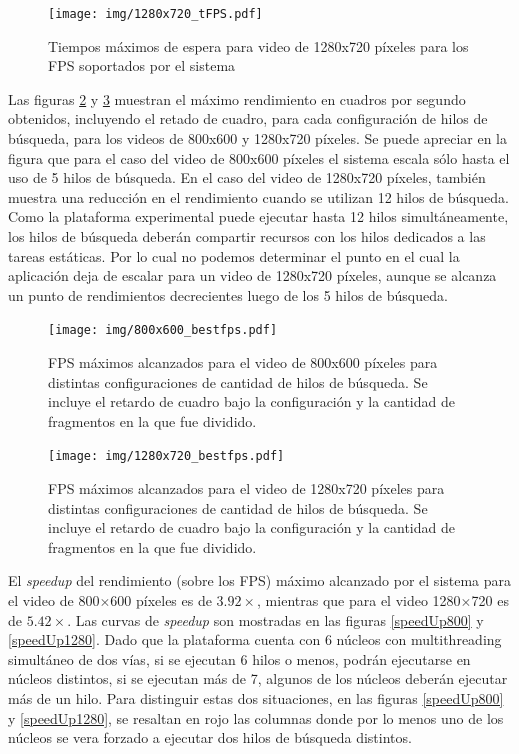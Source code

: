 \begin{figure}[!htb]

	\texttt{[image: img/1280x720\_tFPS.pdf]}
	\caption{Tiempos máximos de espera para video de 1280x720 píxeles para
	los FPS soportados por el sistema}
	\label{1280tFPS}

\end{figure}

Las figuras \ref{bestFPS800} y \ref{bestFPS1280} muestran el máximo rendimiento
en cuadros por segundo obtenidos, incluyendo el retado de cuadro, para cada
configuración de hilos de búsqueda, para los videos de 800x600 y 1280x720
píxeles. Se puede apreciar en la figura que para el caso del video de 800x600
píxeles el sistema escala sólo hasta el uso de 5 hilos de búsqueda. En el caso
del video de 1280x720 píxeles, también muestra una reducción en el rendimiento
cuando se utilizan 12 hilos de búsqueda. Como la plataforma experimental puede
ejecutar hasta 12 hilos simultáneamente, los hilos de búsqueda deberán compartir
recursos con los hilos dedicados a las tareas estáticas. Por lo cual no podemos
determinar el punto en el cual la aplicación deja de escalar para un video de
1280x720 píxeles, aunque se alcanza un punto de rendimientos decrecientes luego
de los 5 hilos de búsqueda.

\begin{figure}[!htb]

	\texttt{[image: img/800x600\_bestfps.pdf]}
	\caption{FPS máximos alcanzados para el video de 800x600 píxeles para
	distintas configuraciones de cantidad de hilos de búsqueda. Se incluye
	el retardo de cuadro bajo la configuración y la cantidad de fragmentos
	en la que fue dividido.} \label{bestFPS800}

\end{figure}

\begin{figure}[!htb]

	\texttt{[image: img/1280x720\_bestfps.pdf]}
	\caption{FPS máximos alcanzados para el video de 1280x720 píxeles para
	distintas configuraciones de cantidad de hilos de búsqueda. Se incluye
	el retardo de cuadro bajo la configuración y la cantidad de fragmentos
	en la que fue dividido.}
	\label{bestFPS1280}

\end{figure}

El \emph{speedup} del rendimiento (sobre los FPS) máximo alcanzado por el
sistema para el video de 800$\times$600 píxeles es de $3.92\times$, mientras que
para el video 1280$\times$720 es de $5.42\times$. Las curvas de \emph{speedup}
son mostradas en las figuras \ref{speedUp800} y \ref{speedUp1280}. Dado que la
plataforma cuenta con 6 núcleos con multithreading simultáneo de dos vías, si se
ejecutan 6 hilos o menos, podrán ejecutarse en núcleos distintos, si se ejecutan
más de 7, algunos de los núcleos deberán ejecutar más de un hilo. Para
distinguir estas dos situaciones, en las figuras \ref{speedUp800} y
\ref{speedUp1280}, se resaltan en rojo las columnas donde por lo menos uno de
los núcleos se vera forzado a ejecutar dos hilos de búsqueda distintos.

